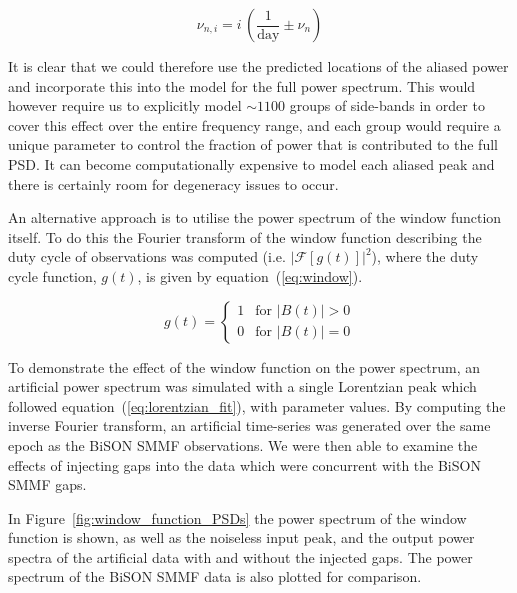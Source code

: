 \begin{equation}
\nu_{n, i} = i \, (\frac{1}{\mathrm{day}} \pm \nu_{n})
\label{eq:sidebands}
\end{equation}

It is clear that we could therefore use the predicted locations of the aliased power and incorporate this into the model for the full power spectrum. This would however require us to explicitly model $\sim 1100$ groups of side-bands in order to cover this effect over the entire frequency range, and each group would require a unique parameter to control the fraction of power that is contributed to the full PSD. It can become computationally expensive to model each aliased peak and there is certainly room for degeneracy issues to occur.

An alternative approach is to utilise the power spectrum of the window function itself. To do this the Fourier transform of the window function describing the duty cycle of observations was computed (i.e. $\left|\mathcal{F}\left[g(t)\right]\right|^2$), where the duty cycle function, $g(t)$, is given by equation~(\ref{eq:window}).

\begin{equation}
g(t) = 
\begin{cases} 
1 & \text{for } |B(t)| > 0 \\
0       & \text{for } |B(t)| = 0
\end{cases}
\label{eq:window}
\end{equation}

To demonstrate the effect of the window function on the power spectrum, an artificial power spectrum was simulated with a single Lorentzian peak which followed equation~(\ref{eq:lorentzian_fit}), with parameter values. By computing the inverse Fourier transform, an artificial time-series was generated over the same epoch as the BiSON SMMF observations. We were then able to examine the effects of injecting gaps into the data which were concurrent with the BiSON SMMF gaps. 

In Figure~\ref{fig:window_function_PSDs} the power spectrum of the window function is shown, as well as the noiseless input peak, and the output power spectra of the artificial data with and without the injected gaps. The power spectrum of the BiSON SMMF data is also plotted for comparison.

